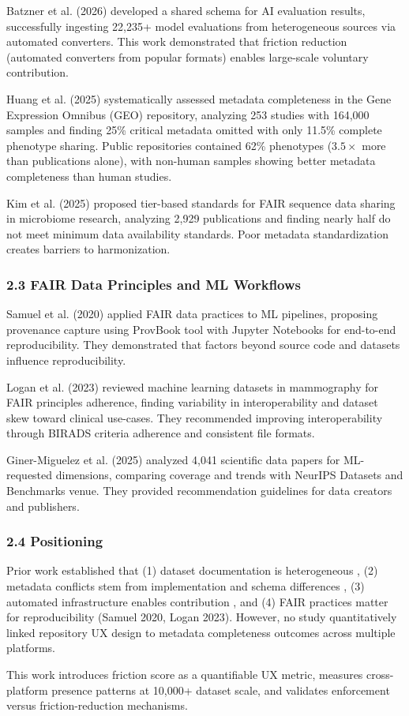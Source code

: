 Batzner et al. (2026) developed a shared schema for AI evaluation results, successfully ingesting 22,235+ model evaluations from heterogeneous sources via automated converters. This work demonstrated that friction reduction (automated converters from popular formats) enables large-scale voluntary contribution.

Huang et al. (2025) systematically assessed metadata completeness in the Gene Expression Omnibus (GEO) repository, analyzing 253 studies with 164,000 samples and finding 25\% critical metadata omitted with only 11.5\% complete phenotype sharing. Public repositories contained 62\% phenotypes (3.$5\times$ more than publications alone), with non-human samples showing better metadata completeness than human studies.

Kim et al. (2025) proposed tier-based standards for FAIR sequence data sharing in microbiome research, analyzing 2,929 publications and finding nearly half do not meet minimum data availability standards. Poor metadata standardization creates barriers to harmonization.

\subsubsection{2.3 FAIR Data Principles and ML Workflows}

Samuel et al. (2020) applied FAIR data practices to ML pipelines, proposing provenance capture using ProvBook tool with Jupyter Notebooks for end-to-end reproducibility. They demonstrated that factors beyond source code and datasets influence reproducibility.

Logan et al. (2023) reviewed machine learning datasets in mammography for FAIR principles adherence, finding variability in interoperability and dataset skew toward clinical use-cases. They recommended improving interoperability through BIRADS criteria adherence and consistent file formats.

Giner-Miguelez et al. (2025) analyzed 4,041 scientific data papers for ML-requested dimensions, comparing coverage and trends with NeurIPS Datasets and Benchmarks venue. They provided recommendation guidelines for data creators and publishers.

\subsubsection{2.4 Positioning}

Prior work established that (1) dataset documentation is heterogeneous \citep{Yang2024Navigating}, (2) metadata conflicts stem from implementation and schema differences \citep{Strecker2026Metadata}, (3) automated infrastructure enables contribution \citep{Batzner2026Every}, and (4) FAIR practices matter for reproducibility (Samuel 2020, Logan 2023). However, no study quantitatively linked repository UX design to metadata completeness outcomes across multiple platforms.

This work introduces friction score as a quantifiable UX metric, measures cross-platform presence patterns at 10,000+ dataset scale, and validates enforcement versus friction-reduction mechanisms.
